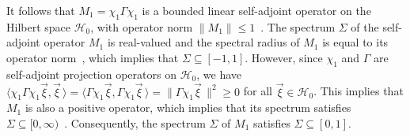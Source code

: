 \documentclass{cmslatex}
\begin{document}
It follows that $M_1=\chi_1\Gamma\chi_1$ is a bounded linear self-adjoint
operator on the Hilbert space $\mathscr{H}_0$, with operator norm
$\|M_1\|\leq1$~\cite{Reed-1980,Stone:64}. The spectrum $\Sigma$ of the
self-adjoint operator $M_1$ is real-valued and the spectral radius of
$M_1$ is equal to its operator norm~\cite{Reed-1980}, which implies that
$\Sigma\subseteq[-1,1]$. However, since $\chi_1$ and $\Gamma$ are self-adjoint projection
operators on $\mathscr{H}_0$, we have 
$\langle\chi_1\Gamma\chi_1\vec{\xi},\vec{\xi}\,\rangle=\langle\Gamma\chi_1\vec{\xi},\Gamma\chi_1\vec{\xi}\,\rangle=\|\Gamma\chi_1\vec{\xi}\,\|^2\geq0$ 
for all $\vec{\xi}\in\mathscr{H}_0$. This implies that $M_1$ is also a
positive operator, which implies that its spectrum satisfies
$\Sigma\subseteq[0,\infty)$~\cite{Stone:64}.  Consequently, the spectrum $\Sigma$ of $M_1$
satisfies $\Sigma\subseteq[0,1]$.       
\end{document}
